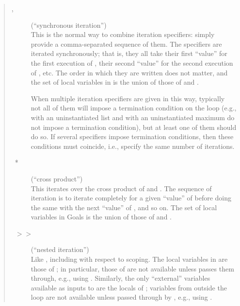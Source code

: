 \begin{quote}
\begin{description}
\item[,~] (``synchronous iteration'')%
\\
    This is the normal way to combine iteration specifiers: simply
    provide a comma-separated sequence of them.  The specifiers are
    iterated synchronously; that is, they all take their first
    ``value'' for the first execution of , their second ``value''
    for the second execution of , etc.  The order in which they
    are written does not matter, and the set of local variables in
     is the union of those of  and
    .

    When multiple iteration specifiers are given in this way,
    typically not all of them will impose a termination condition on
    the loop (e.g.,  with an uninstantiated list and
     with an uninstantiated maximum do not impose a termination
    condition), but at least one of them should do so.  If several
    specifiers impose termination conditions, then these conditions
    must coincide, i.e., specify the same number of iterations.

\item[~*~] (``cross product'')%
\\
    This iterates over the cross product of  and
    .
    The sequence of iteration is to iterate  completely for a
    given ``value'' of  before doing the same with the next
    ``value'' of , and so on.  The set of local variables in
    Goals is the union of those of  and .

\item[~$>>$~] (``nested iteration'')%
\\
    Like , including with
    respect to scoping.  The local variables in  are those of
    ; in particular, those of  are not
    available
    unless  passes them through, e.g., using  .
    Similarly, the only ``external'' variables available as inputs to
     are the locals of ; variables from
    outside the
    loop are not available unless passed through by , e.g.,
    using  .
\end{description}
\end{quote}

